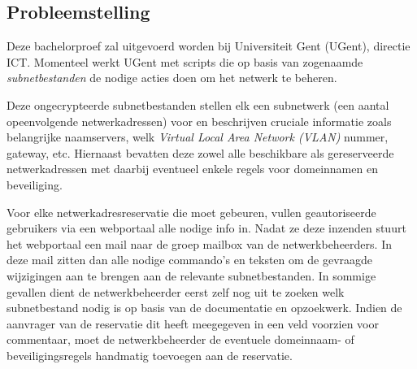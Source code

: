 \subsection{Probleemstelling}
\label{sec:probleemstelling}
Deze bachelorproef zal uitgevoerd worden bij Universiteit Gent (UGent), directie ICT. Momenteel werkt UGent met scripts die op basis van zogenaamde \textit{subnetbestanden} de nodige acties doen om het netwerk te beheren. 

Deze ongecrypteerde subnetbestanden stellen elk een subnetwerk (een aantal opeenvolgende netwerkadressen) voor en beschrijven cruciale informatie zoals belangrijke naamservers, welk \textit{Virtual Local Area Network (VLAN)} nummer, gateway, etc. Hiernaast bevatten deze zowel alle beschikbare als gereserveerde netwerkadressen met daarbij eventueel enkele regels voor domeinnamen en beveiliging.

Voor elke netwerkadresreservatie die moet gebeuren, vullen geautoriseerde gebruikers via een webportaal alle nodige info in.
Nadat ze deze inzenden stuurt het webportaal een mail naar de groep mailbox van de netwerkbeheerders.
In deze mail zitten dan alle nodige commando's en teksten om de gevraagde wijzigingen aan te brengen aan de relevante subnetbestanden. In sommige gevallen dient de netwerkbeheerder eerst zelf nog uit te zoeken welk subnetbestand nodig is op basis van de documentatie en opzoekwerk. Indien de aanvrager van de reservatie dit heeft meegegeven in een veld voorzien voor commentaar, moet de netwerkbeheerder de eventuele domeinnaam- of beveiligingsregels handmatig toevoegen aan de reservatie.

